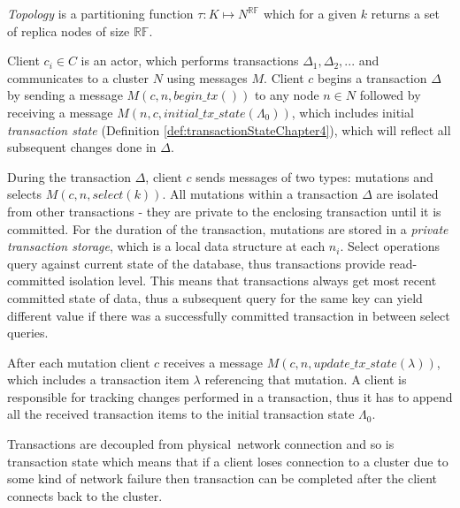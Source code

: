 \documentclass[runningheads,a4paper]{llncs}
\newcommand{\nodes}{$\mathit{N}$\xspace}
\newcommand{\transaction}{$\Delta$\xspace}
\newcommand{\beginTransactionMessage}{$\mathit{M}(c, n, \mathit{begin\_tx}())$\xspace}
\newcommand{\initialTxStateMessage}{$\mathit{M}(n, c, \mathit{initial\_tx\_state}(\Lambda_{0}))$\xspace}
\newcommand{\selectMessage}{$\mathit{M}(c,n,select(k))$\xspace}
\newcommand{\updateTxStateMessage}{$\mathit{M}(c, n, \mathit{update\_tx\_state}(\lambda))$\xspace}
\newcommand{\txItem}{$\lambda$\xspace}
\newcommand{\txStatei}[1]{$\Lambda_{#1}$\xspace}
\newcommand{\client}{$c$\xspace}
\newcommand{\node}[1]{$n_{#1}$\xspace}
\begin{document}
\begin{definition}
  \label{def:topology}
  \emph{Topology} is a partitioning function $\tau:\mathit{K} \mapsto \mathit{N}^{\mathbb{RF}}$ which for a given $k$ returns a set of replica nodes of size $\mathbb{RF}$. 
\end{definition}

Client $c_{i}\in\mathit{C}$ is an actor, which performs transactions $\Delta_{1}, \Delta_{2}, ...$ and communicates to a cluster \nodes using messages $\mathit{M}$. Client \client begins a transaction \transaction by sending a message \beginTransactionMessage to any node $n\in\mathit{N}$ followed by receiving a message \initialTxStateMessage, which includes initial \emph{transaction state} (Definition \ref{def:transactionStateChapter4}), which will reflect all subsequent changes done in \transaction.

During the transaction \transaction, client \client sends messages of two types: mutations and selects \selectMessage. All mutations within a transaction \transaction are isolated from other transactions - they are private to the enclosing transaction until it is committed. For the duration of the transaction, mutations are stored in a \emph{private transaction storage}, which is a local data structure at each \node{i}. Select operations query against current state of the database, thus transactions provide read-committed isolation level. This means that transactions always get most recent committed state of data, thus a subsequent query for the same key can yield different value if there was a successfully committed transaction in between select queries. 

After each mutation client \client receives a message \updateTxStateMessage, which includes a transaction item \txItem referencing that mutation. A client is responsible for tracking changes performed in a transaction, thus it has to append all the received transaction items to the initial transaction state \txStatei{0}. 

Transactions are decoupled from physical network connection and so is transaction state which means that if a client loses connection to a cluster due to some kind of network failure then transaction can be completed after the client connects back to the cluster.
\end{document}
